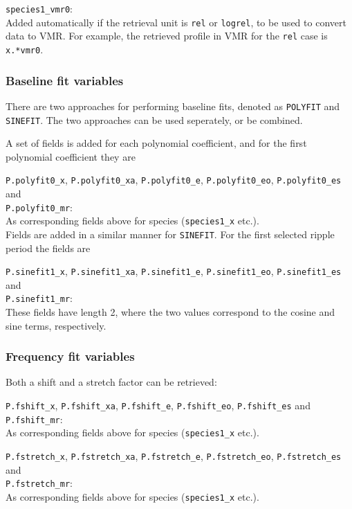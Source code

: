 \documentclass[a4paper,11pt]{article}
\newcommand{\newfield}{\vspace{1ex}\noindent}
\begin{document}
\newfield
\verb|species1_vmr0|:\\
Added automatically if the retrieval unit is \verb|rel| or \verb|logrel|, to be
used to convert data to VMR. For example, the retrieved profile in VMR for the
\verb|rel| case is \verb|x.*vmr0|.



\subsubsection{Baseline fit variables}
%
There are two approaches for performing baseline fits, denoted as
\verb|POLYFIT| and \verb|SINEFIT|. The two approaches can be used 
seperately, or be combined.

A set of fields is added for each polynomial coefficient, and
for the first polynomial coefficient they are

\newfield \verb|P.polyfit0_x|, \verb|P.polyfit0_xa|,
\verb|P.polyfit0_e|,
\verb|P.polyfit0_eo|, \verb|P.polyfit0_es| and\\
\verb|P.polyfit0_mr|:\\
As corresponding fields above for species (\verb|species1_x| etc.).\\

\noindent
Fields are added in a similar manner for \verb|SINEFIT|. For the first 
selected ripple period the fields are

\newfield \verb|P.sinefit1_x|, \verb|P.sinefit1_xa|,
\verb|P.sinefit1_e|,
\verb|P.sinefit1_eo|, \verb|P.sinefit1_es| and\\
\verb|P.sinefit1_mr|:\\
These fields have length 2, where the two values correspond to the cosine and
sine terms, respectively. 


\subsubsection{Frequency fit variables}
%
Both a shift and a stretch factor can be retrieved:

\newfield \verb|P.fshift_x|, \verb|P.fshift_xa|,
\verb|P.fshift_e|,
\verb|P.fshift_eo|, \verb|P.fshift_es| and\\\verb|P.fshift_mr|:\\
As corresponding fields above for species (\verb|species1_x| etc.).

\newfield \verb|P.fstretch_x|, \verb|P.fstretch_xa|,
\verb|P.fstretch_e|,
\verb|P.fstretch_eo|, \verb|P.fstretch_es| and\\\verb|P.fstretch_mr|:\\
As corresponding fields above for species (\verb|species1_x| etc.).
\end{document}
